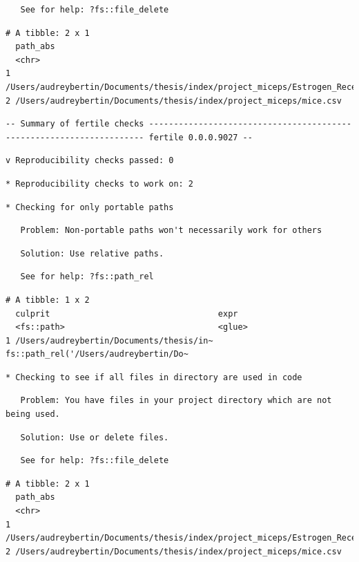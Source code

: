 \documentclass[12pt,twoside]{reedthesis}
\begin{document}
\begin{verbatim}
   See for help: ?fs::file_delete
\end{verbatim}
\begin{verbatim}
# A tibble: 2 x 1
  path_abs                                                                      
  <chr>                                                                         
1 /Users/audreybertin/Documents/thesis/index/project_miceps/Estrogen_Receptors.~
2 /Users/audreybertin/Documents/thesis/index/project_miceps/mice.csv            
\end{verbatim}
\begin{verbatim}
-- Summary of fertile checks --------------------------------------------------------------------- fertile 0.0.0.9027 --
\end{verbatim}
\begin{verbatim}
v Reproducibility checks passed: 0
\end{verbatim}
\begin{verbatim}
* Reproducibility checks to work on: 2
\end{verbatim}
\begin{verbatim}
* Checking for only portable paths
\end{verbatim}
\begin{verbatim}
   Problem: Non-portable paths won't necessarily work for others
\end{verbatim}
\begin{verbatim}
   Solution: Use relative paths.
\end{verbatim}
\begin{verbatim}
   See for help: ?fs::path_rel
\end{verbatim}
\begin{verbatim}
# A tibble: 1 x 2
  culprit                                  expr                                 
  <fs::path>                               <glue>                               
1 /Users/audreybertin/Documents/thesis/in~ fs::path_rel('/Users/audreybertin/Do~
\end{verbatim}
\begin{verbatim}
* Checking to see if all files in directory are used in code
\end{verbatim}
\begin{verbatim}
   Problem: You have files in your project directory which are not being used.
\end{verbatim}
\begin{verbatim}
   Solution: Use or delete files.
\end{verbatim}
\begin{verbatim}
   See for help: ?fs::file_delete
\end{verbatim}
\begin{verbatim}
# A tibble: 2 x 1
  path_abs                                                                      
  <chr>                                                                         
1 /Users/audreybertin/Documents/thesis/index/project_miceps/Estrogen_Receptors.~
2 /Users/audreybertin/Documents/thesis/index/project_miceps/mice.csv            
\end{verbatim}
\normalsize
\end{document}
